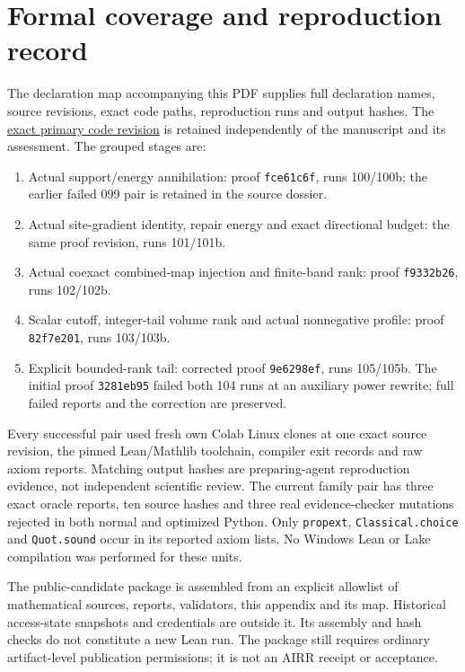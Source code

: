 \documentclass[11pt]{article}
\begin{document}
\section{Formal coverage and reproduction record}
The declaration map accompanying this PDF supplies full declaration names,
source revisions, exact code paths, reproduction runs and output hashes.
The \href{https://github.com/lluiseriksson/THE-ERIKSSON-PROGRAMME/tree/9e6298ef199961ff14e94db3dfd2e297ec931fc6/YangMills/RG}{exact primary code revision}
is retained independently of the manuscript and its assessment.
The grouped stages are:
\begin{enumerate}
\item Actual support/energy annihilation: proof \texttt{fce61c6f}, runs
100/100b; the earlier failed 099 pair is retained in the source dossier.
\item Actual site-gradient identity, repair energy and exact directional
budget: the same proof revision, runs 101/101b.
\item Actual coexact combined-map injection and finite-band rank:
proof \texttt{f9332b26}, runs 102/102b.
\item Scalar cutoff, integer-tail volume rank and actual nonnegative
profile: proof \texttt{82f7e201}, runs 103/103b.
\item Explicit bounded-rank tail: corrected proof \texttt{9e6298ef},
runs 105/105b. The initial proof \texttt{3281eb95} failed both 104 runs
at an auxiliary power rewrite; full failed reports and the correction
are preserved.
\end{enumerate}
Every successful pair used fresh own Colab Linux clones at one exact
source revision, the pinned Lean/Mathlib toolchain, compiler exit records
and raw axiom reports. Matching output hashes are preparing-agent
reproduction evidence, not independent scientific review. The current
family pair has three exact oracle reports, ten source hashes and three
real evidence-checker mutations rejected in both normal and optimized
Python. Only \texttt{propext}, \texttt{Classical.choice} and
\texttt{Quot.sound} occur in its reported axiom lists. No Windows Lean
or Lake compilation was performed for these units.

The public-candidate package is assembled from an explicit allowlist of
mathematical sources, reports, validators, this appendix and its map.
Historical access-state snapshots and credentials are outside it. Its
assembly and hash checks do not constitute a new Lean run. The package
still requires ordinary artifact-level publication permissions; it is not
an AIRR receipt or acceptance.
\end{document}
